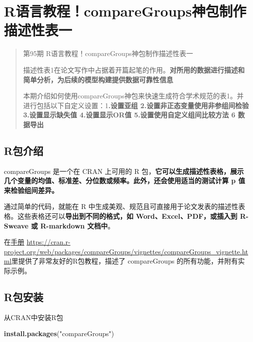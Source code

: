 \documentclass[
]{article}
\author{}
\date{\vspace{-2.5em}}
\newenvironment{Shaded}{\begin{snugshade}}{\end{snugshade}}
\newcommand{\FunctionTok}[1]{\textcolor[rgb]{0.13,0.29,0.53}{\textbf{#1}}}
\newcommand{\NormalTok}[1]{#1}
\newcommand{\StringTok}[1]{\textcolor[rgb]{0.31,0.60,0.02}{#1}}
\begin{document}
{
\setcounter{tocdepth}{2}
\tableofcontents
}
\section{R语言教程！compareGroups神包制作描述性表一}\label{compare}

\begin{quote}
第95期 R语言教程！compareGroups神包制作描述性表一

描述性表1在论文写作中占据着开篇起笔的作用。\textbf{对所用的数据进行描述和简单分析，为后续的模型构建提供数据可靠性信息}

本期介绍如何使用compareGroups神包来快速生成符合学术规范的表1。并进行包括以下自定义设置：1\textbf{.设置亚组 2.设置非正态变量使用非参组间检验 3.设置显示缺失值 4.设置显示OR值 5.设置使用自定义组间比较方法 6 数据导出}
\end{quote}

\subsection{R包介绍}\label{rux5305ux4ecbux7ecd}

compareGroups 是一个在 CRAN 上可用的 R 包，\textbf{它可以生成描述性表格，展示几个变量的均值、标准差、分位数或频率。此外，还会使用适当的测试计算 p 值来检验组间差异。}

通过简单的代码，就能在 R 中生成美观、规范且可直接用于论文发表的描述性表格。这些表格还可以\textbf{导出到不同的格式，如 Word、Excel、PDF，或插入到 R-Sweave 或 R-markdown 文档中}。

在\href{https://cran.r-project.org/web/packages/compareGroups/vignettes/compareGroups_vignette.html}{手册} \url{https://cran.r-project.org/web/packages/compareGroups/vignettes/compareGroups_vignette.html}里提供了非常友好的R包教程，描述了 compareGroups 的所有功能，并附有实际示例。\\

\subsection{R包安装}\label{rux5305ux5b89ux88c5}

从CRAN中安装R包

\begin{Shaded}
\begin{Highlighting}[]
\FunctionTok{install.packages}\NormalTok{(}\StringTok{"compareGroups"}\NormalTok{) }
\end{Highlighting}
\end{Shaded}
\end{document}

